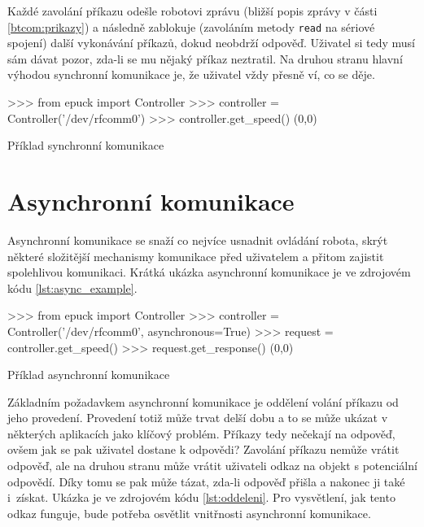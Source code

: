     Každé zavolání příkazu odešle robotovi zprávu (bližší popis zprávy v části
    \ref{btcom:prikazy}) a následně zablokuje (zavoláním metody {\tt read} na
    sériové spojení) další vykonávání příkazů, dokud neobdrží odpověď. Uživatel
    si tedy musí sám dávat pozor, zda-li se mu nějaký příkaz neztratil. Na
    druhou stranu hlavní výhodou synchronní komunikace je, že uživatel vždy
    přesně ví, co se děje.

    \begin{listing}[H]
    \begin{pyc}
>>> from epuck import Controller
>>> controller = Controller('/dev/rfcomm0')
>>> controller.get_speed()
(0,0)
    \end{pyc}
    \caption{Příklad synchronní komunikace}
    \label{lst:sync_example}
    \end{listing}

    \section{Asynchronní komunikace}
    \label{async-impl}

    Asynchronní komunikace se snaží co nejvíce usnadnit ovládání robota, skrýt
    některé složitější mechanismy komunikace před uživatelem a přitom zajistit
    spolehlivou komunikaci. Krátká ukázka asynchronní komunikace je ve
    zdrojovém kódu \ref{lst:async_example}.

    \begin{listing}[H]
    \begin{pyc}
>>> from epuck import Controller
>>> controller = Controller('/dev/rfcomm0', asynchronous=True)
>>> request = controller.get_speed()
>>> request.get_response()
(0,0)
    \end{pyc}
    \caption{Příklad asynchronní komunikace}
    \label{lst:async_example}
    \end{listing}

    Základním požadavkem asynchronní komunikace je oddělení volání příkazu od
    jeho provedení. Provedení totiž může trvat delší dobu a to se může ukázat v
    některých aplikacích jako klíčový problém. Příkazy tedy nečekají na
    odpověď, ovšem jak se pak uživatel dostane k odpovědi? Zavolání příkazu
    nemůže vrátit odpověď, ale na druhou stranu může vrátit uživateli odkaz na
    objekt s potenciální odpovědí. Díky tomu se pak může tázat, zda-li odpověď
    přišla a nakonec ji také i~získat. Ukázka je ve zdrojovém kódu
    \ref{lst:oddeleni}. Pro vysvětlení, jak tento odkaz funguje, bude potřeba
    osvětlit vnitřnosti asynchronní komunikace.

